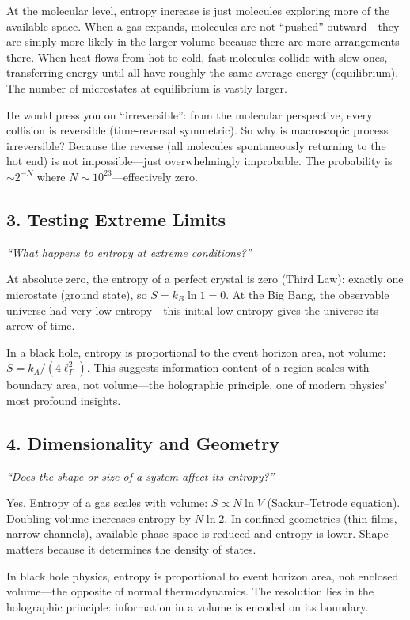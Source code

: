 \documentclass[11pt,openright]{book}
\begin{document}
At the molecular level, entropy increase is just molecules exploring more of the available space. When a gas expands, molecules are not ``pushed'' outward---they are simply more likely in the larger volume because there are more arrangements there. When heat flows from hot to cold, fast molecules collide with slow ones, transferring energy until all have roughly the same average energy (equilibrium). The number of microstates at equilibrium is vastly larger.

He would press you on ``irreversible'': from the molecular perspective, every collision is reversible (time-reversal symmetric). So why is macroscopic process irreversible? Because the reverse (all molecules spontaneously returning to the hot end) is not impossible---just overwhelmingly improbable. The probability is $\sim 2^{-N}$ where $N \sim 10^{23}$---effectively zero.

\subsection*{3. Testing Extreme Limits}
\textit{``What happens to entropy at extreme conditions?''}

At absolute zero, the entropy of a perfect crystal is zero (Third Law): exactly one microstate (ground state), so $S = k_B \ln 1 = 0$. At the Big Bang, the observable universe had very low entropy---this initial low entropy gives the universe its arrow of time.

In a black hole, entropy is proportional to the event horizon area, not volume: $S = k_A / (4 \ell_P^2)$. This suggests information content of a region scales with boundary area, not volume---the holographic principle, one of modern physics' most profound insights.

\subsection*{4. Dimensionality and Geometry}
\textit{``Does the shape or size of a system affect its entropy?''}

Yes. Entropy of a gas scales with volume: $S \propto N \ln V$ (Sackur--Tetrode equation). Doubling volume increases entropy by $N \ln 2$. In confined geometries (thin films, narrow channels), available phase space is reduced and entropy is lower. Shape matters because it determines the density of states.

In black hole physics, entropy is proportional to event horizon area, not enclosed volume---the opposite of normal thermodynamics. The resolution lies in the holographic principle: information in a volume is encoded on its boundary.
\end{document}
